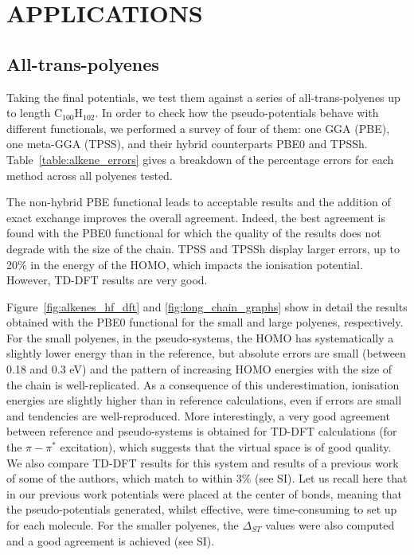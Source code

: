 \documentclass[12pt]{article}
\begin{document}
\section*{\sffamily \large APPLICATIONS}

\subsection*{\sffamily \large All-trans-polyenes}

Taking the final potentials, we test them against a series of all-trans-polyenes up to length C\(_{100}\)H\(_{102}\).
In order to check how the pseudo-potentials behave with different functionals, we performed a survey of four of them: one GGA (PBE), one meta-GGA (TPSS), and their hybrid counterparts PBE0 and TPSSh.\cite{pbe0,pbe,tpss,tpssh}
Table~\ref{table:alkene_errors} gives a breakdown of the percentage errors for each method across
all polyenes tested.

The non-hybrid PBE functional leads to acceptable results and the addition of exact exchange improves the overall agreement.
Indeed, the best agreement is found with the PBE0 functional for which the quality of the results does not degrade with the size of the chain.
TPSS and TPSSh display larger errors, up to 20\% in the energy of the HOMO, which impacts the ionisation potential.
However, TD-DFT results are very good.

Figure~\ref{fig:alkenes_hf_dft} and \ref{fig:long_chain_graphs} show in detail the results obtained with the PBE0 functional for the small and large polyenes, respectively.
For the small polyenes, in the pseudo-systems, the HOMO has systematically a slightly lower energy than in the reference,
but absolute errors are small (between 0.18 and 0.3 eV) and the pattern of increasing HOMO energies with the size of the chain is well-replicated. As a consequence of this underestimation, 
ionisation energies are slightly higher than in reference calculations, even if errors are small and tendencies are well-reproduced. 
More interestingly, a very good agreement between reference and pseudo-systems is obtained for TD-DFT
calculations (for the $\pi-\pi^*$ excitation), which suggests that the virtual space is of good
quality.
We also compare TD-DFT results for this system and results of a previous work of some of the authors, which match to within 3\% (see SI).\cite{drujon_pseudopotentials_2013}
Let us recall here that in our previous work potentials were placed at the center of bonds, meaning that the pseudo-potentials generated, whilst effective, were time-consuming to set up for each molecule.
For the smaller polyenes, the $\Delta_{ST}$ values were also computed and a good agreement is achieved (see SI).
\end{document}
